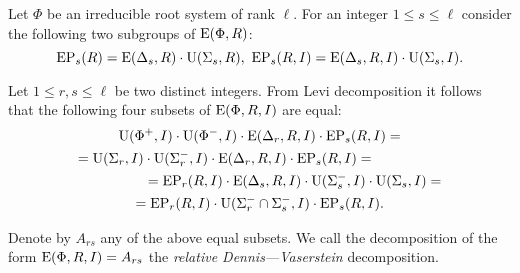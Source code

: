 Let $\Phi$ be an irreducible root system of rank $\ell$.
For an integer $1 \leq s \leq \ell$ consider the following two subgroups of $\operatorname{E}(\Phi, R)$:
$$\operatorname{EP}_s(R) = \operatorname{E}(\Delta_s, R) \cdot \operatorname{U}(\Sigma_s, R),\ \operatorname{EP}_s(R, I) = \operatorname{E}(\Delta_s, R, I) \cdot \operatorname{U}(\Sigma_s, I).$$

Let $1\leq r,s \leq \ell$ be two distinct integers.
From Levi decomposition it follows that the following four subsets of $\operatorname{E}(\Phi, R, I)$ are equal:
\begin{multline*}
\operatorname{U}(\Phi^+, I)\cdot \operatorname{U}(\Phi^-, I) \cdot \operatorname{E}(\Delta_r, R, I) \cdot \operatorname{EP}_s(R, I) = \\
= \operatorname{U}(\Sigma_r, I)\cdot \operatorname{U}(\Sigma^-_r, I) \cdot \operatorname{E}(\Delta_r, R, I) \cdot \operatorname{EP}_s(R, I) = \hspace{5em} \\
\hspace{5em} = \operatorname{EP}_r(R, I) \cdot \operatorname{E}(\Delta_s, R, I) \cdot \operatorname{U}(\Sigma_s^-, I)\cdot \operatorname{U}(\Sigma_s, I) = \\
= \operatorname{EP}_r(R, I) \cdot \operatorname{U}(\Sigma^-_r\cap \Sigma^-_s, I) \cdot \operatorname{EP}_s(R, I).
\end{multline*}
\begin{dfn}
 Denote by $A_{rs}$ any of the above equal subsets.
 We call the decomposition of the form $\operatorname{E}(\Phi, R, I) = A_{rs}$ the {\it relative Dennis---Vaserstein} decomposition.
\end{dfn}

